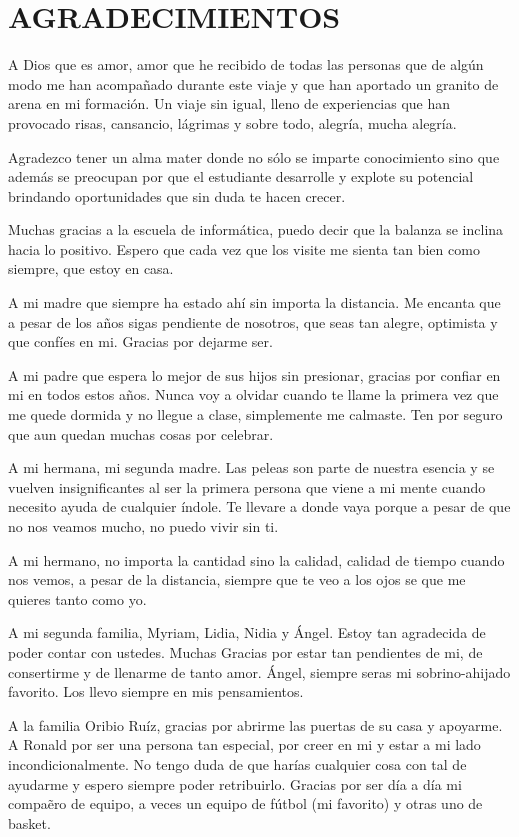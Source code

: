 \chapter*{AGRADECIMIENTOS}
A Dios que es amor, amor que he recibido de todas las personas que de alg\'un modo me han acompa\~nado durante este viaje y que han aportado un granito de arena en mi formaci\'on. Un viaje sin igual, lleno de experiencias que han provocado risas, cansancio, l\'agrimas y sobre todo, alegr\'ia, mucha alegr\'ia.

Agradezco tener un alma mater donde no s\'olo se imparte conocimiento sino que adem\'as se preocupan por que el estudiante desarrolle y explote su potencial brindando oportunidades que sin duda te hacen crecer.

Muchas gracias a la escuela de inform\'atica, puedo decir que la balanza se inclina hacia lo positivo. Espero que cada vez que los visite me sienta tan bien como siempre, que estoy en casa.

A mi madre que siempre ha estado ah\'i sin importa la distancia. Me encanta que a pesar de los a\~nos sigas pendiente de nosotros, que seas tan alegre, optimista y que conf\'ies en mi. Gracias por dejarme ser.

A mi padre que espera lo mejor de sus hijos sin presionar, gracias por confiar en mi en todos estos a\~nos. Nunca voy a olvidar cuando te llame la primera vez que me quede dormida y no llegue a clase, simplemente  me calmaste. Ten por seguro que aun quedan muchas cosas por celebrar.

A mi hermana, mi segunda madre. Las peleas son parte de nuestra esencia y se vuelven insignificantes al ser la primera persona que viene a mi mente cuando necesito ayuda de cualquier \'indole. Te llevare a donde vaya porque a pesar de que no nos veamos mucho, no puedo vivir sin ti.

A mi hermano, no importa la cantidad sino la calidad, calidad de tiempo cuando nos vemos, a pesar de la distancia, siempre que te veo a los ojos se que me quieres tanto como yo.

A mi segunda familia, Myriam, Lidia, Nidia y \'Angel. Estoy tan agradecida de poder contar con ustedes. Muchas Gracias por estar tan pendientes de mi, de consertirme y de llenarme de tanto amor. \'Angel, siempre seras mi sobrino-ahijado favorito. Los llevo siempre en mis pensamientos.

A la familia Oribio Ru\'iz, gracias por abrirme las puertas de su casa y apoyarme. A Ronald por ser una persona tan especial, por creer en mi y estar a mi lado incondicionalmente. No tengo duda de que har\'ias cualquier cosa con tal de ayudarme y espero siempre poder retribuirlo. Gracias por ser d\'ia a d\'ia mi compa\~ero de equipo, a veces un equipo de f\'utbol (mi favorito) y otras uno de basket. 

